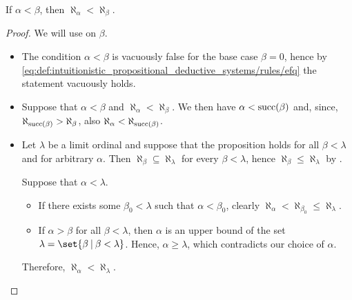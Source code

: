 \begin{proposition}\label{thm:aleph_hierarchy_is_strictly_monotone}
  If \( \alpha < \beta \), then \( \aleph_\alpha < \aleph_\beta \).
\end{proposition}
\begin{proof}
  We will use  on \( \beta \).
  \begin{itemize}
    \item The condition \( \alpha < \beta \) is vacuously false for the base case \( \beta = 0 \), hence by \eqref{eq:def:intuitionistic_propositional_deductive_systems/rules/efq} the statement vacuously holds.

    \item Suppose that \( \alpha < \beta \) and \( \aleph_\alpha < \aleph_\beta \). We then have \( \alpha < \operatorname{succ}(\beta) \) and, since, \( \aleph_{\operatorname{succ}(\beta)} > \aleph_\beta \), also \( \aleph_\alpha < \aleph_{\operatorname{succ}(\beta)} \).

    \item Let \( \lambda \) be a limit ordinal and suppose that the proposition holds for all \( \beta < \lambda \) and for arbitrary \( \alpha \). Then \( \aleph_\beta \subseteq \aleph_\lambda \) for every \( \beta < \lambda \), hence \( \aleph_\beta \leq \aleph_\lambda \) by .

    Suppose that \( \alpha < \lambda \).
    \begin{itemize}
      \item If there exists some \( \beta_0 < \lambda \) such that \( \alpha < \beta_0 \), clearly \( \aleph_\alpha < \aleph_{\beta_0} \leq \aleph_\lambda \).
      \item If \( \alpha > \beta \) for all \( \beta < \lambda \), then \( \alpha \) is an upper bound of the set \( \lambda = \set{ \beta \given \beta < \lambda } \). Hence, \( \alpha \geq \lambda \), which contradicts our choice of \( \alpha \).
    \end{itemize}

    Therefore, \( \aleph_\alpha < \aleph_\lambda \).
  \end{itemize}
\end{proof}

